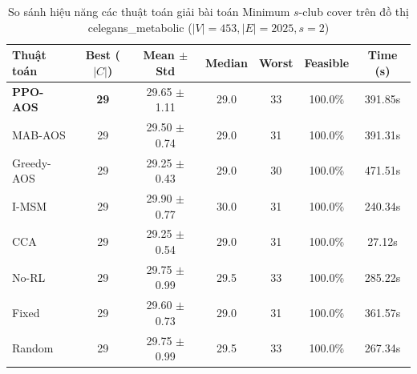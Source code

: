 \begin{table}[htbp]
\centering
\caption{So sánh hiệu năng các thuật toán giải bài toán Minimum $s$-club cover trên đồ thị celegans_metabolic ($|V|=453, |E|=2025, s=2$)}
\label{tab:results_celegans_metabolic}
\begin{tabular}{lcccccc}
\hline
\textbf{Thuật toán} & \textbf{Best ($|C|$)} & \textbf{Mean $\pm$ Std} & \textbf{Median} & \textbf{Worst} & \textbf{Feasible} & \textbf{Time (s)} \\
\hline
\textbf{PPO-AOS} & \textbf{29} & 29.65 $\pm$ 1.11 & 29.0 & 33 & 100.0\% & 391.85s \\
MAB-AOS & 29 & 29.50 $\pm$ 0.74 & 29.0 & 31 & 100.0\% & 391.31s \\
Greedy-AOS & 29 & 29.25 $\pm$ 0.43 & 29.0 & 30 & 100.0\% & 471.51s \\
I-MSM & 29 & 29.90 $\pm$ 0.77 & 30.0 & 31 & 100.0\% & 240.34s \\
CCA & 29 & 29.25 $\pm$ 0.54 & 29.0 & 31 & 100.0\% & 27.12s \\
No-RL & 29 & 29.75 $\pm$ 0.99 & 29.5 & 33 & 100.0\% & 285.22s \\
Fixed & 29 & 29.60 $\pm$ 0.73 & 29.0 & 31 & 100.0\% & 361.57s \\
Random & 29 & 29.75 $\pm$ 0.99 & 29.5 & 33 & 100.0\% & 267.34s \\
\hline
\end{tabular}
\end{table}
